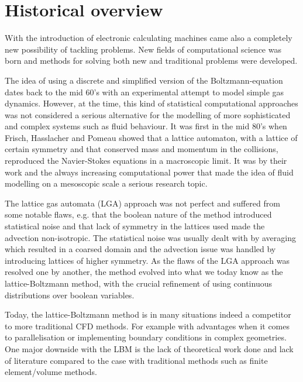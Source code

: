 \section{Historical overview}
With the introduction of electronic calculating machines came also a
completely new possibility of tackling problems. New fields of
computational science was born and methods for solving both new and
traditional problems were developed.

The idea of using a discrete and simplified version of the
Boltzmann-equation dates back to the mid 60's \cite{scholarpedia-lbm}
with an experimental attempt to model simple gas dynamics. However, at
the time, this kind of statistical computational approaches was not
considered a serious alternative for the modelling of more
sophisticated and complex systems such as fluid behaviour. It was
first in the mid 80's when Frisch, Hasslacher and Pomeau showed that a
lattice automaton, with a lattice of certain symmetry and that
conserved mass and momentum in the collisions, reproduced the
Navier-Stokes equations in a macroscopic limit. It was by their work
and the always increasing computational power that made the idea of
fluid modelling on a mesoscopic scale a serious research
topic. \cite{wolf-gladrow}

The lattice gas automata (LGA) approach was not perfect and suffered
from some notable flaws, e.g. that the boolean nature of the method
introduced statistical noise and that lack of symmetry in the lattices
used made the advection non-isotropic. The statistical noise was
usually dealt with by averaging which resulted in a coarsed domain and
the advection issue was handled by introducing lattices of higher
symmetry. As the flaws of the LGA approach was resolved one by
another, the method evolved into what we today know as the
lattice-Boltzmann method, with the crucial refinement of using
continuous distributions over boolean variables. \cite{wolf-gladrow}

Today, the lattice-Boltzmann method is in many situations indeed a
competitor to more traditional CFD methods. For example with
advantages when it comes to parallelisation or implementing boundary
conditions in complex geometries. One major downside with the LBM is
the lack of theoretical work done and lack of literature compared to
the case with traditional methods such as finite element/volume
methods. \cite{junk-asym}
